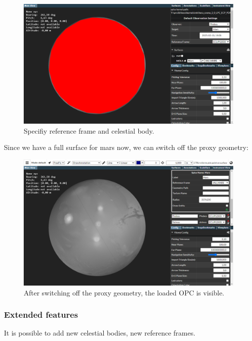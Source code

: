 \begin{figure}[h!]
	\centering
	\includegraphics[width=1\textwidth]{pics/surfaceRefFrame.png}
	\caption{Specifiy reference frame and celestial body.}
\end{figure}

Since we have a full surface for mars now, we can switch off the proxy
geometry:

\begin{figure}[h!]
	\centering
	\includegraphics[width=1\textwidth]{pics/molaObservation.png}
	\caption{After switching off the proxy geometry, the loaded OPC is visible.}
\end{figure}

\newpage

\hypertarget{extended-features}{%
	\subsubsection{Extended features}\label{extended-features}}

It is possible to add new celestial bodies, new reference frames.

